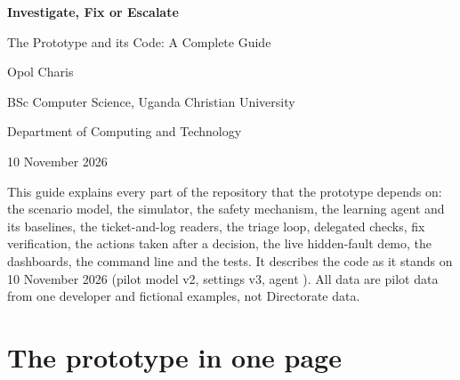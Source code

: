 \documentclass[11pt,a4paper]{article}
\newcommand{\file}[1]{{\small\path{#1}}}
\begin{document}
\begin{titlepage}
\centering
\vspace*{3cm}
{\LARGE\bfseries Investigate, Fix or Escalate\par}
\vspace{0.4cm}
{\Large The Prototype and its Code: A Complete Guide\par}
\vspace{1.2cm}
{\large Opol Charis\par}
{BSc Computer Science, Uganda Christian University\par}
\vspace{0.3cm}
{Department of Computing and Technology\par}
\vspace{1.5cm}
{10 November 2026\par}
\vfill
\begin{minipage}{0.85\linewidth}\small
This guide explains every part of the repository that the prototype depends on: the scenario
model, the simulator, the safety mechanism, the learning agent and its baselines, the
ticket-and-log readers, the triage loop, delegated checks, fix verification, the actions taken
after a decision, the live hidden-fault demo, the dashboards, the command line and the tests.
It describes the code as it stands on 10 November 2026 (pilot model v2, settings v3, agent
\file{v3_shielded_seed0}). All data are pilot data from one developer and fictional examples,
not Directorate data.
\end{minipage}
\vspace{1cm}
\end{titlepage}

\tableofcontents
\newpage

\section{The prototype in one page}
\end{document}
